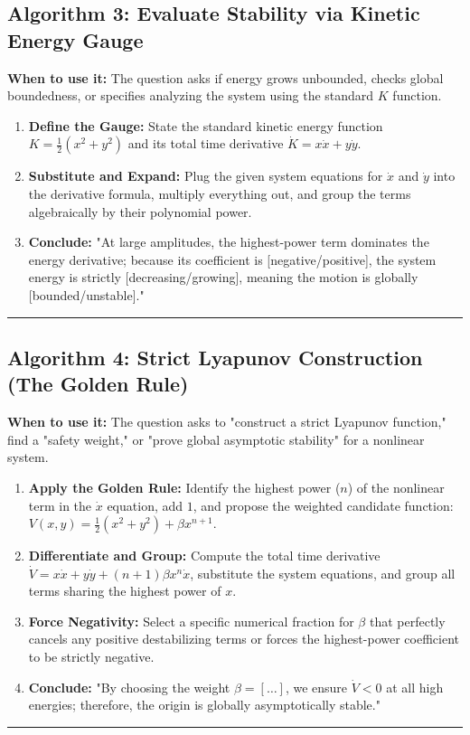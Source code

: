 \documentclass[11pt, a4paper]{report}
\begin{document}
\subsection*{Algorithm 3: Evaluate Stability via Kinetic Energy Gauge}
\textbf{When to use it:} The question asks if energy grows unbounded, checks global boundedness, or specifies analyzing the system using the standard $K$ function.
\begin{enumerate}[label=\textbf{\arabic*.}]
    \item \textbf{Define the Gauge:} State the standard kinetic energy function $K = \frac{1}{2}(x^2 + y^2)$ and its total time derivative $\dot{K} = x\dot{x} + y\dot{y}$.
    \item \textbf{Substitute and Expand:} Plug the given system equations for $\dot{x}$ and $\dot{y}$ into the derivative formula, multiply everything out, and group the terms algebraically by their polynomial power.
    \item \textbf{Conclude:} "At large amplitudes, the highest-power term dominates the energy derivative; because its coefficient is [negative/positive], the system energy is strictly [decreasing/growing], meaning the motion is globally [bounded/unstable]."
\end{enumerate}
\vspace{1em}
\noindent\rule{\textwidth}{0.4pt}
\vspace{1em}

\subsection*{Algorithm 4: Strict Lyapunov Construction (The Golden Rule)}
\textbf{When to use it:} The question asks to "construct a strict Lyapunov function," find a "safety weight," or "prove global asymptotic stability" for a nonlinear system.
\begin{enumerate}[label=\textbf{\arabic*.}]
    \item \textbf{Apply the Golden Rule:} Identify the highest power ($n$) of the nonlinear term in the $\dot{x}$ equation, add $1$, and propose the weighted candidate function: $V(x,y) = \frac{1}{2}(x^2 + y^2) + \beta x^{n+1}$.
    \item \textbf{Differentiate and Group:} Compute the total time derivative $\dot{V} = x\dot{x} + y\dot{y} + (n+1)\beta x^n \dot{x}$, substitute the system equations, and group all terms sharing the highest power of $x$.
    \item \textbf{Force Negativity:} Select a specific numerical fraction for $\beta$ that perfectly cancels any positive destabilizing terms or forces the highest-power coefficient to be strictly negative.
    \item \textbf{Conclude:} "By choosing the weight $\beta = [\dots]$, we ensure $\dot{V} < 0$ at all high energies; therefore, the origin is globally asymptotically stable."
\end{enumerate}
\vspace{1em}
\noindent\rule{\textwidth}{0.4pt}
\vspace{1em}
\end{document}
